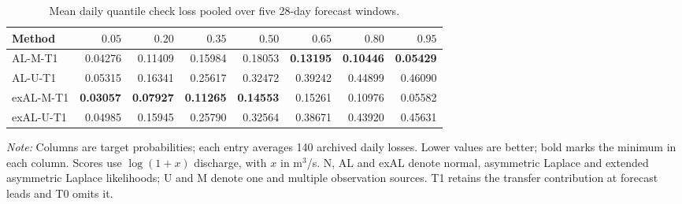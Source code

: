 \begin{table}[!htbp]
\centering
\begin{threeparttable}
\caption{Mean daily quantile check loss pooled over five 28-day forecast windows.}
\label{tab:quantile_check_loss_pooled}
\setlength{\tabcolsep}{4pt}
\begin{tabular}{lrrrrrrr}
\hline
Method & $0.05$ & $0.20$ & $0.35$ & $0.50$ & $0.65$ & $0.80$ & $0.95$ \\
\hline
AL-M-T1 & 0.04276 & 0.11409 & 0.15984 & 0.18053 & \textbf{0.13195} & \textbf{0.10446} & \textbf{0.05429} \\
AL-U-T1 & 0.05315 & 0.16341 & 0.25617 & 0.32472 & 0.39242 & 0.44899 & 0.46090 \\
exAL-M-T1 & \textbf{0.03057} & \textbf{0.07927} & \textbf{0.11265} & \textbf{0.14553} & 0.15261 & 0.10976 & 0.05582 \\
exAL-U-T1 & 0.04985 & 0.15945 & 0.25790 & 0.32564 & 0.38671 & 0.43920 & 0.45631 \\
\hline
\end{tabular}
\begin{tablenotes}\footnotesize
\item \textit{Note:} Columns are target probabilities; each entry averages 140 archived daily losses. Lower values are better; bold marks the minimum in each column. Scores use $\log(1+x)$ discharge, with $x$ in m$^3$/s. N, AL and exAL denote normal, asymmetric Laplace and extended asymmetric Laplace likelihoods; U and M denote one and multiple observation sources. T1 retains the transfer contribution at forecast leads and T0 omits it.
\end{tablenotes}
\end{threeparttable}
\end{table}
